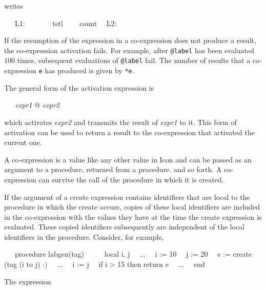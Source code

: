 \noindent
writes

{\ttfamily\mdseries
\ \ \ L1:\newline
 \ \ \ \ \ \ \ tstl \ \ \ \ count\newline
 \ \ L2:}

If the resumption of the expression in a co-expression does not
produce a result, the co-expression activation fails.  For example,
after \texttt{@label} has been evaluated 100 times, subsequent
evaluations of \texttt{@label} fail. The number of results that a
co-expression \texttt{e} has produced is given by \texttt{*e}.

The general form of the activation expression is

\textit{\ \ \ expr1 }@ \textit{expr2}

\noindent which activates \textit{expr2} and transmits the result of
\textit{expr1} to it. This form of activation can be used to return a
result to the co-expression that activated the current one.

A co-expression is a value like any other value in Icon and can be
passed as an argument to a procedure, returned from a procedure. and
so forth. A co-expression can survive the call of the procedure in
which it is created.

If the argument of a create expression contains identifiers that are
local to the procedure in which the create occurs, copies of these
local identifiers are included in the co-expression with the values
they have at the time the create expression is evaluated. These copied
identifiers subsequently are independent of the local identifiers in
the procedure. Consider, for example,

{\ttfamily\mdseries
\ \ \ procedure labgen(tag)\newline
 \ \ \ \ \ local i, j\newline
\ \  ...\newline
\ \  i := 10\newline
\ \  j := 20\newline
\ \  e := create (tag {\textbar}{\textbar} (i to j) {\textbar}{\textbar} {\textquotedbl}:{\textquotedbl})\newline
\ \  ...\newline
\ \  i := j\newline
\ \  if i {\textgreater} 15 then return e\newline
\ \  ...\newline
 \ \ end}

The expression

